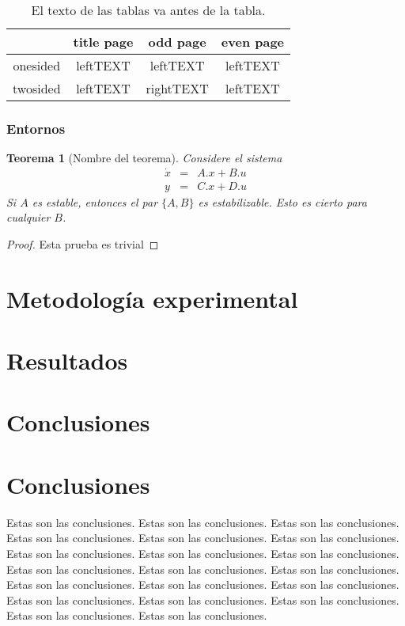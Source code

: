 \documentclass[twocolumn]{maeb2015}
\newtheorem{theorem}{Teorema}
\begin{document}
\begin{table}[htb]
\caption{El texto de las tablas va antes de la tabla.}
\begin{center}
{\tt
\begin{tabular}{|c||c|c|c|}\hline
&title page&odd page&even page\\\hline\hline
onesided&leftTEXT&leftTEXT&leftTEXT\\\hline
twosided&leftTEXT&rightTEXT&leftTEXT\\\hline
\end{tabular}
}
\end{center}
\end{table}

\subsubsection{Entornos}
\begin{theorem}[Nombre del teorema]
Considere el sistema
\begin{equation}
\begin{array}{rrr}
\dot x&=&A.x+B.u\\[2mm]
y&=& C.x+D.u
\end{array}
\end{equation}
Si $A$ es estable, entonces el par $\{A,B\}$ es estabilizable.
Esto es cierto para cualquier $B$.
\end{theorem}

\begin{proof}
Esta prueba es trivial
\end{proof}


\section{Metodología experimental}


\section{Resultados}

\section{Conclusiones}



\section{Conclusiones}
Estas son las conclusiones.
Estas son las conclusiones.
Estas son las conclusiones.
Estas son las conclusiones.
Estas son las conclusiones.
Estas son las conclusiones.
Estas son las conclusiones.
Estas son las conclusiones.
Estas son las conclusiones.
Estas son las conclusiones.
Estas son las conclusiones.
Estas son las conclusiones.
Estas son las conclusiones.
Estas son las conclusiones.
Estas son las conclusiones.
Estas son las conclusiones.
Estas son las conclusiones.
Estas son las conclusiones.
Estas son las conclusiones.
Estas son las conclusiones.
\end{document}
